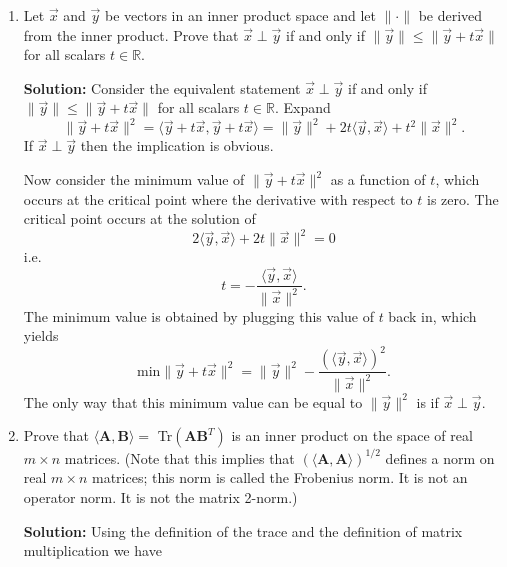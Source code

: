 \documentclass[11pt,fleqn]{article}
\begin{document}
\begin{enumerate}
\item Let $\vec{x}$ and $\vec{y}$ be vectors in an inner product space and let $\|\cdot\|$ be derived from the inner product. Prove that $\vec{x}\perp\vec{y}$ if and only if $\|\vec{y}\|\le\|\vec{y}+t\vec{x}\|$ for all scalars $t\in\mathbb{R}$.

{\bf Solution:} Consider the equivalent statement $\vec{x}\perp\vec{y}$ if and only if $\|\vec{y}\|\le\|\vec{y}+t\vec{x}\|$ for all scalars $t\in\mathbb{R}$.
Expand
\[\|\vec{y}+t\vec{x}\|^2 = \langle\vec{y}+t\vec{x},\vec{y}+t\vec{x}\rangle = \|\vec{y}\|^2 + 2t\langle\vec{y},\vec{x}\rangle + t^2\|\vec{x}\|^2.\]
If $\vec{x}\perp\vec{y}$ then the implication is obvious.

Now consider the minimum value of $\|\vec{y}+t\vec{x}\|^2$ as a function of $t$, which occurs at the critical point where the derivative with respect to $t$ is zero.
The critical point occurs at the solution of
\[2\langle\vec{y},\vec{x}\rangle + 2t\|\vec{x}\|^2=0\]
i.e.
\[t = -\frac{\langle\vec{y},\vec{x}\rangle}{\|\vec{x}\|^2}.\]
The minimum value is obtained by plugging this value of $t$ back in, which yields
\[\text{min}\|\vec{y} + t\vec{x}\|^2 = \|\vec{y}\|^2 - \frac{(\langle\vec{y},\vec{x}\rangle)^2}{\|\vec{x}\|^2}.\]
The only way that this minimum value can be equal to $\|\vec{y}\|^2$ is if $\vec{x}\perp\vec{y}$.

\item Prove that $\langle\mathbf{A},\mathbf{B}\rangle=$ Tr$\left(\mathbf{AB}^T\right)$ is an inner product on the space of real $m\times n$ matrices. (Note that this implies that $(\langle\mathbf{A},\mathbf{A}\rangle)^{1/2}$ defines a norm on real $m\times n$ matrices; this norm is called the Frobenius norm. It is not an operator norm. It is not the matrix 2-norm.)

{\bf Solution:} Using the definition of the trace and the definition of matrix multiplication we have


\end{enumerate}
\end{document}
